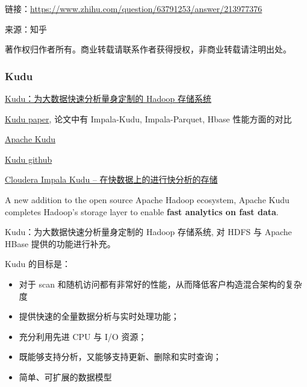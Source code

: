 \documentclass[hyperref, UTF-8]{ctexart}
\begin{document}
链接：\url{https://www.zhihu.com/question/63791253/answer/213977376}  

来源：知乎  

著作权归作者所有。商业转载请联系作者获得授权，非商业转载请注明出处。  

\subsubsection{Kudu}
\label{sec:orgc7e9624}
\href{https://oschina.net/news/73633/kudu-apache-hadoop}{Kudu：为大数据快速分析量身定制的 Hadoop 存储系统}   

\href{http://kudu.apache.org/kudu.pdf}{Kudu paper}, 论文中有 Impala-Kudu, Impala-Parquet, Hbase 性能方面的对比   

\href{https://kudu.apache.org/overview.html}{Apache Kudu}   

\href{https://github.com/apache/kudu}{Kudu github}   

\href{http://www.cnblogs.com/lpthread/p/4923183.html}{Cloudera Impala Kudu – 在快数据上的进行快分析的存储}   

A new addition to the open source Apache Hadoop ecosystem, Apache Kudu completes Hadoop's storage layer to enable \textbf{fast analytics on fast data}.   

Kudu：为大数据快速分析量身定制的 Hadoop 存储系统, 对 HDFS 与 Apache HBase 提供的功能进行补充。

Kudu 的目标是：
\begin{itemize}
\item 对于 scan 和随机访问都有非常好的性能，从而降低客户构造混合架构的复杂度
\item 提供快速的全量数据分析与实时处理功能；
\item 充分利用先进 CPU 与 I/O 资源；
\item 既能够支持分析，又能够支持更新、删除和实时查询；
\item 简单、可扩展的数据模型
\end{itemize}
\end{document}
